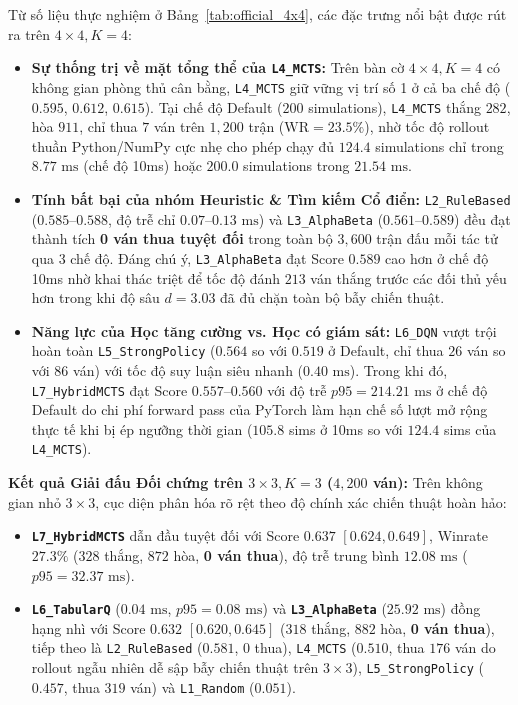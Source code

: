 \documentclass[a4paper,12pt]{report}
\begin{document}
Từ số liệu thực nghiệm ở Bảng~\ref{tab:official_4x4}, các đặc trưng nổi bật được rút ra trên $4 \times 4, K=4$:
\begin{itemize}[leftmargin=1.2cm]
    \item \textbf{Sự thống trị về mặt tổng thể của \texttt{L4\_MCTS}:} Trên bàn cờ $4 \times 4, K=4$ có không gian phòng thủ cân bằng, \texttt{L4\_MCTS} giữ vững vị trí số 1 ở cả ba chế độ ($0.595$, $0.612$, $0.615$). Tại chế độ Default ($200$ simulations), \texttt{L4\_MCTS} thắng $282$, hòa $911$, chỉ thua $7$ ván trên $1{,}200$ trận ($\text{WR}=23.5\%$), nhờ tốc độ rollout thuần Python/NumPy cực nhẹ cho phép chạy đủ $124.4$ simulations chỉ trong $8.77\text{ ms}$ (chế độ 10ms) hoặc $200.0$ simulations trong $21.54\text{ ms}$.
    \item \textbf{Tính bất bại của nhóm Heuristic \& Tìm kiếm Cổ điển:} \texttt{L2\_RuleBased} ($0.585$--$0.588$, độ trễ chỉ $0.07$--$0.13\text{ ms}$) và \texttt{L3\_AlphaBeta} ($0.561$--$0.589$) đều đạt thành tích \textbf{0 ván thua tuyệt đối} trong toàn bộ $3{,}600$ trận đấu mỗi tác tử qua 3 chế độ. Đáng chú ý, \texttt{L3\_AlphaBeta} đạt Score $0.589$ cao hơn ở chế độ 10ms nhờ khai thác triệt để tốc độ đánh $213$ ván thắng trước các đối thủ yếu hơn trong khi độ sâu $d=3.03$ đã đủ chặn toàn bộ bẫy chiến thuật.
    \item \textbf{Năng lực của Học tăng cường vs. Học có giám sát:} \texttt{L6\_DQN} vượt trội hoàn toàn \texttt{L5\_StrongPolicy} ($0.564$ so với $0.519$ ở Default, chỉ thua $26$ ván so với $86$ ván) với tốc độ suy luận siêu nhanh ($0.40\text{ ms}$). Trong khi đó, \texttt{L7\_HybridMCTS} đạt Score $0.557$--$0.560$ với độ trễ $p95 = 214.21\text{ ms}$ ở chế độ Default do chi phí forward pass của PyTorch làm hạn chế số lượt mở rộng thực tế khi bị ép ngưỡng thời gian ($105.8$ sims ở 10ms so với $124.4$ sims của \texttt{L4\_MCTS}).
\end{itemize}

\textbf{Kết quả Giải đấu Đối chứng trên $3 \times 3, K=3$ ($4{,}200$ ván):} Trên không gian nhỏ $3 \times 3$, cục diện phân hóa rõ rệt theo độ chính xác chiến thuật hoàn hảo:
\begin{itemize}[leftmargin=1.2cm]
    \item \textbf{\texttt{L7\_HybridMCTS}} dẫn đầu tuyệt đối với Score $0.637$ $[0.624, 0.649]$, Winrate $27.3\%$ ($328$ thắng, $872$ hòa, \textbf{0 ván thua}), độ trễ trung bình $12.08\text{ ms}$ ($p95 = 32.37\text{ ms}$).
    \item \textbf{\texttt{L6\_TabularQ}} ($0.04\text{ ms}$, $p95=0.08\text{ ms}$) và \textbf{\texttt{L3\_AlphaBeta}} ($25.92\text{ ms}$) đồng hạng nhì với Score $0.632$ $[0.620, 0.645]$ ($318$ thắng, $882$ hòa, \textbf{0 ván thua}), tiếp theo là \texttt{L2\_RuleBased} ($0.581$, $0$ thua), \texttt{L4\_MCTS} ($0.510$, thua $176$ ván do rollout ngẫu nhiên dễ sập bẫy chiến thuật trên $3\times 3$), \texttt{L5\_StrongPolicy} ($0.457$, thua $319$ ván) và \texttt{L1\_Random} ($0.051$).
\end{itemize}
\end{document}
